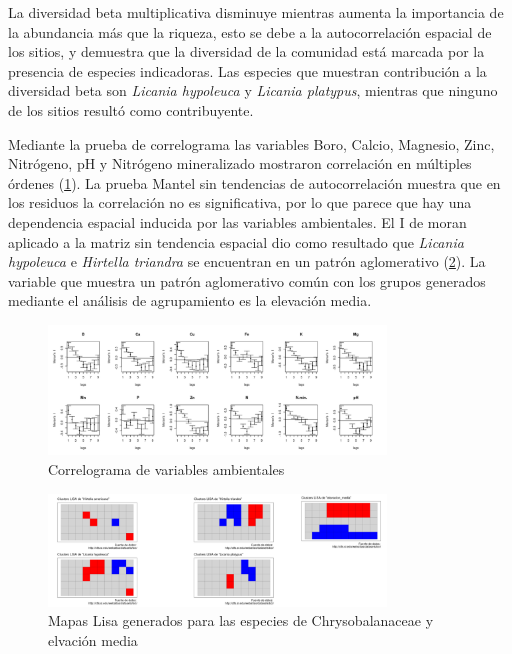 \documentclass[11pt,]{article}
\begin{document}
La diversidad beta multiplicativa disminuye mientras aumenta la
importancia de la abundancia más que la riqueza, esto se debe a la
autocorrelación espacial de los sitios, y demuestra que la diversidad de
la comunidad está marcada por la presencia de especies indicadoras. Las
especies que muestran contribución a la diversidad beta son
\emph{Licania hypoleuca} y \emph{Licania platypus}, mientras que ninguno
de los sitios resultó como contribuyente.

Mediante la prueba de correlograma las variables Boro, Calcio, Magnesio,
Zinc, Nitrógeno, pH y Nitrógeno mineralizado mostraron correlación en
múltiples órdenes (\ref{correlograma}). La prueba Mantel sin tendencias
de autocorrelación muestra que en los residuos la correlación no es
significativa, por lo que parece que hay una dependencia espacial
inducida por las variables ambientales. El I de moran aplicado a la
matriz sin tendencia espacial dio como resultado que \emph{Licania
hypoleuca} e \emph{Hirtella triandra} se encuentran en un patrón
aglomerativo (\ref{lisamaps}). La variable que muestra un patrón
aglomerativo común con los grupos generados mediante el análisis de
agrupamiento es la elevación media.

\begin{figure}
\centering
\includegraphics[width=0.80000\textwidth]{correlogramavariables.png}
\caption{Correlograma de variables ambientales\label{correlograma}}
\end{figure}

\begin{figure}
\centering
\includegraphics[width=0.80000\textwidth]{clusterlisaespecies.png}
\caption{Mapas Lisa generados para las especies de Chrysobalanaceae y
elvación media\label{lisamaps}}
\end{figure}
\end{document}
